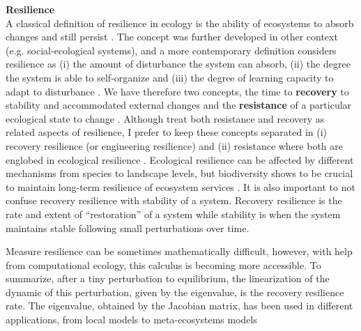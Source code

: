 \textbf{Resilience}\label{res} \\
A classical definition of resilience in ecology is the ability of ecosystems to absorb changes and still persist \parencite{Holling1973}.
The concept was further developed in other context (e.g. social-ecological systems), and a more contemporary definition considers resilience as (i) the amount of disturbance the system can absorb, (ii) the degree the system is able to self-organize and (iii) the degree of learning capacity to adapt to disturbance \parencite{Cumming2011}.
We have therefore two concepts, the time to \textbf{recovery} to stability and accommodated external changes \parencite{pimm1984,Folke2002} and the \textbf{resistance} of a particular ecological state to change \parencite{Peterson1998}.
Although \textcite{Oliver2015} treat both resistance and recovery as related aspects of resilience, I prefer to keep these concepts separated in (i) recovery resilience (or engineering resilience) and (ii) resistance where both are englobed in ecological resilience \parencite{Hodgson2015,Nimmo2015}.
Ecological resilience can be affected by different mechanisms from species to landscape levels, but biodiversity shows to be crucial to maintain long-term resilience of ecosystem services \parencite{Oliver2015}.
It is also important to not confuse recovery resilience with stability of a system.
Recovery resilience is the rate and extent of ``restoration'' of a system while stability is when the system maintains stable following small perturbations over time.


Measure resilience can be sometimes mathematically difficult, however, with help from computational ecology, this calculus is becoming more accessible.
To summarize, after a tiny perturbation to equilibrium, the linearization of the dynamic of this perturbation, given by the eigenvalue, is the recovery resilience rate.
The eigenvalue, obtained by the Jacobian matrix, has been used in different applications, from local models to meta-ecosystems models \parencite{Gravel2016} \\

